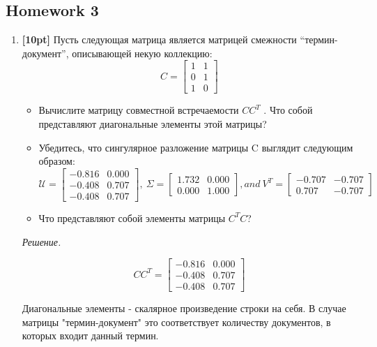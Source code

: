 \subsection*{Homework 3}

\begin{enumerate}
	\item \textbf{[10pt]} Пусть следующая матрица является матрицей смежности ``термин-документ'', 
	описывающей некую коллекцию:
	\begin{equation*}
	C = 
		\begin{bmatrix}
			1 & 1 \\
			0 & 1 \\
			1 & 0
		\end{bmatrix}
	\end{equation*}
	\begin{itemize}
		\item 	Вычислите матрицу совместной встречаемости $CC^T$ . Что собой представляют 
		диагональные элементы этой матрицы?
		\item Убедитесь, что сингулярное разложение матрицы C выглядит следующим образом:
		\begin{equation*}
			\mathcal{U} = 
			\begin{bmatrix}
			-0.816 & 0.000 \\
			-0.408 & 0.707 \\
			-0.408 & 0.707
			\end{bmatrix}, \
			\Sigma = 
			\begin{bmatrix}
			1.732 & 0.000 \\
			0.000 & 1.000
			\end{bmatrix}, and \
			V^T = 
			\begin{bmatrix}
			-0.707 & -0.707 \\
			0.707 & - 0.707
			\end{bmatrix}
		\end{equation*}
		\item Что представляют собой элементы матрицы $C^TC$?
	\end{itemize}
	\textit{Решение.} 
	
	\begin{equation*}
	CC^T = 
	\begin{bmatrix}
		-0.816 & 0.000 \\
		-0.408 & 0.707 \\
		-0.408 & 0.707
	\end{bmatrix}
	\end{equation*}
	
	Диагональные элементы - скалярное произведение строки на себя. В случае матрицы 
	"термин-документ" это соответствует количеству документов, в которых входит данный термин.
	

\end{enumerate}
